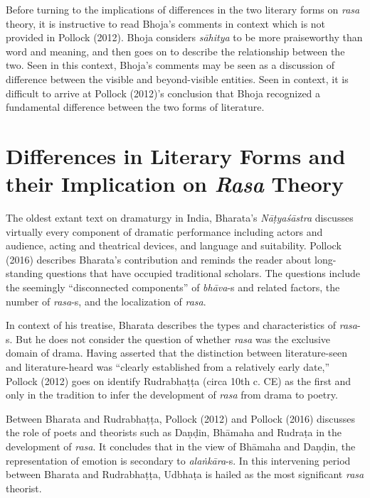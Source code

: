 Before turning to the implications of differences in the two literary forms on \textsl{rasa} theory, it is instructive to read Bhoja’s comments in context which is not provided in Pollock (2012). Bhoja considers \textsl{sāhitya} to be more praiseworthy than word and meaning, and then goes on to describe the relationship between the two. Seen in this context, Bhoja’s comments may be seen as a discussion of difference between the visible and beyond-visible entities. Seen in context, it is difficult to arrive at Pollock (2012)’s conclusion that Bhoja
 recognized a fundamental difference between the two forms of literature.

\section*{Differences in Literary Forms and their Implication on \textsl{Rasa} Theory}

The oldest extant text on dramaturgy in India, Bharata’s \textsl{Nāṭyaśāstra} discusses virtually every component of dramatic performance including actors and audience, acting and theatrical devices, and language and suitability. Pollock (2016) describes Bharata’s contribution and reminds the reader about long-standing questions that have occupied traditional scholars. The questions include the seemingly “disconnected components” of \textsl{bhāva}-s and related factors, the number of \textsl{rasa}-s, and the localization of \textsl{rasa}.

In context of his treatise, Bharata describes the types and characteristics of \textsl{rasa}-s. But he does not consider the question of whether \textsl{rasa} was the exclusive domain of drama. Having asserted that the distinction between literature-seen and literature-heard was “clearly established from a relatively early date,” Pollock (2012) goes on identify Rudrabhaṭṭa (circa 10th c. CE) as the first and only in the tradition to infer the development of \textsl{rasa} from drama to poetry. 

Between Bharata and Rudrabhaṭṭa, Pollock (2012) and Pollock (2016) discusses the role of poets and theorists such as Daṇḍin, Bhāmaha and Rudraṭa in the development of \textsl{rasa}. It concludes that in the view of Bhāmaha and Daṇḍin, the representation of emotion is secondary to \textsl{alaṅkāra}-s. In this intervening period between Bharata and Rudrabhaṭṭa, Udbhaṭa is hailed as the most significant \textsl{rasa} theorist. 

